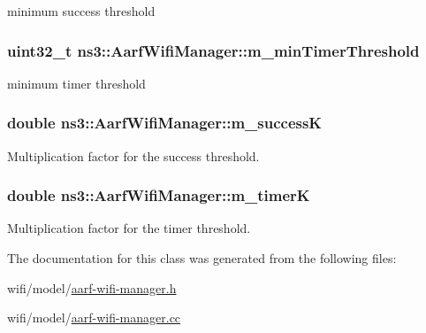minimum success threshold 

\subsubsection[{\texorpdfstring{m\+\_\+min\+Timer\+Threshold}{m_minTimerThreshold}}]{\setlength{\rightskip}{0pt plus 5cm}uint32\+\_\+t ns3\+::\+Aarf\+Wifi\+Manager\+::m\+\_\+min\+Timer\+Threshold\hspace{0.3cm}{\ttfamily [private]}}\hypertarget{classns3_1_1AarfWifiManager_a87cd21fd98cc5330f70cb3960f5acca4}{}\label{classns3_1_1AarfWifiManager_a87cd21fd98cc5330f70cb3960f5acca4}


minimum timer threshold 

\subsubsection[{\texorpdfstring{m\+\_\+successK}{m_successK}}]{\setlength{\rightskip}{0pt plus 5cm}double ns3\+::\+Aarf\+Wifi\+Manager\+::m\+\_\+successK\hspace{0.3cm}{\ttfamily [private]}}\hypertarget{classns3_1_1AarfWifiManager_a37e881b1ae22c8c7fd4fca36e027117a}{}\label{classns3_1_1AarfWifiManager_a37e881b1ae22c8c7fd4fca36e027117a}


Multiplication factor for the success threshold. 

\subsubsection[{\texorpdfstring{m\+\_\+timerK}{m_timerK}}]{\setlength{\rightskip}{0pt plus 5cm}double ns3\+::\+Aarf\+Wifi\+Manager\+::m\+\_\+timerK\hspace{0.3cm}{\ttfamily [private]}}\hypertarget{classns3_1_1AarfWifiManager_a3d4f7898576f87f739dd0f3746387bd1}{}\label{classns3_1_1AarfWifiManager_a3d4f7898576f87f739dd0f3746387bd1}


Multiplication factor for the timer threshold. 



The documentation for this class was generated from the following files\+:\begin{DoxyCompactItemize}
\item 
wifi/model/\hyperlink{aarf-wifi-manager_8h}{aarf-\/wifi-\/manager.\+h}\item 
wifi/model/\hyperlink{aarf-wifi-manager_8cc}{aarf-\/wifi-\/manager.\+cc}\end{DoxyCompactItemize}
